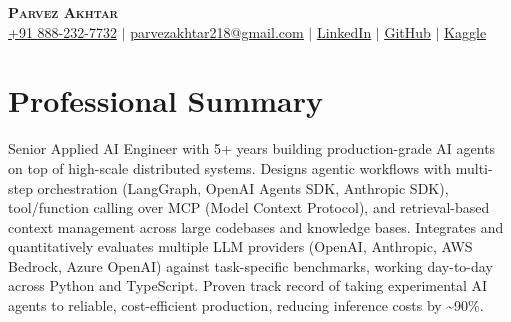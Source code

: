 \documentclass[11pt,a4paper]{article}
\begin{document}
\begin{center}
    \textbf{\Huge \scshape Parvez Akhtar} \\ \vspace{1pt}
    \small \href{tel:+918882327732}{+91 888-232-7732} $\vert$ \href{mailto:parvezakhtar218@gmail.com}{\underline{parvezakhtar218@gmail.com}} $\vert$
    \href{https://www.linkedin.com/in/parvezakhtar/}{\underline{LinkedIn}} $\vert$
    \href{https://github.com/ipmob}{\underline{GitHub}} $\vert$
    \href{https://www.kaggle.com/parvez218}{\underline{Kaggle}}
\end{center}

\section{Professional Summary}
\small{Senior Applied AI Engineer with 5+ years building production-grade AI agents on top of high-scale distributed systems. Designs agentic workflows with multi-step orchestration (LangGraph, OpenAI Agents SDK, Anthropic SDK), tool/function calling over MCP (Model Context Protocol), and retrieval-based context management across large codebases and knowledge bases. Integrates and quantitatively evaluates multiple LLM providers (OpenAI, Anthropic, AWS Bedrock, Azure OpenAI) against task-specific benchmarks, working day-to-day across Python and TypeScript. Proven track record of taking experimental AI agents to reliable, cost-efficient production, reducing inference costs by \textasciitilde{}90\%.}

\end{document}
